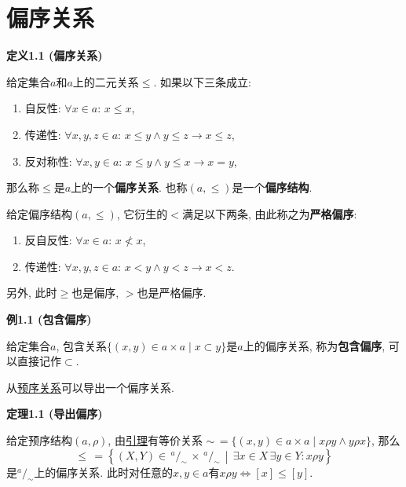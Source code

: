 \documentclass[UTF8]{ctexart}
\begin{document}
\setlength{\abovedisplayskip}{1pt}
\setlength{\belowdisplayskip}{1pt}

\section{偏序关系}

\hypertarget{sec:定义1.1}{}
\noindent\textbf{定义1.1 (偏序关系)}

给定集合$a$和$a$上的二元关系$\leqslant$. 如果以下三条成立:
\begin{enumerate}
    \item 自反性: $\forall x\in a:\,x\leqslant x$,
    \item 传递性: $\forall x,y,z\in a:\,
    x\leqslant y\land y\leqslant z\to x\leqslant z$,
    \item 反对称性: $\forall x,y\in a:\,x\leqslant y\land y\leqslant x\to x=y$,
\end{enumerate}
那么称$\leqslant$是$a$上的一个\textbf{偏序关系}.
也称$(a,\leqslant)$是一个\textbf{偏序结构}.

\vspace{10pt}

给定偏序结构$(a,\leqslant)$, 它衍生的$<$满足以下两条, 由此称之为\textbf{严格偏序}:
\begin{enumerate}
    \item 反自反性: $\forall x\in a:\,x\nless x$,
    \item 传递性: $\forall x,y,z\in a:\,x<y\land y<z\to x<z$.
\end{enumerate}
另外, 此时$\geqslant$也是偏序, $>$也是严格偏序.

\vspace{10pt}

\hypertarget{sec:例1.1}{}
\noindent\textbf{例1.1 (包含偏序)}

给定集合$a$, 包含关系$\{(x,y)\in a\times a\mid x\subset y\}$是$a$上的偏序关系,
称为\textbf{包含偏序}, 可以直接记作$\subset$.

\vspace{10pt}

从\href{01 预序关系#nameddest=sec:定义1.1}{预序关系}可以导出一个偏序关系.

\vspace{10pt}

\hypertarget{sec:定理1.1}{}
\noindent\textbf{定理1.1 (导出偏序)}

给定预序结构$(a,\rho)$, 由\href{01 预序关系#nameddest=sec:定理1.1}{引理}有等价关系
$\sim\,=\{(x,y)\in a\times a\mid x\rho y\land y\rho x\}$, 那么
\[
    \leqslant\,=\left\{(X,Y)\in
    \,^{\displaystyle a}\!/_{\displaystyle\sim}\,\times
    \,^{\displaystyle a}\!/_{\displaystyle\sim}\,\middle\vert\,
    \exists x\in X\,\exists y\in Y:x\rho y\right\}
\]
是$^{\displaystyle a}\!/_{\displaystyle\sim}$上的偏序关系.
此时对任意的$x,y\in a$有$x\rho y\Leftrightarrow[x]\leqslant[y]$.
\end{document}
